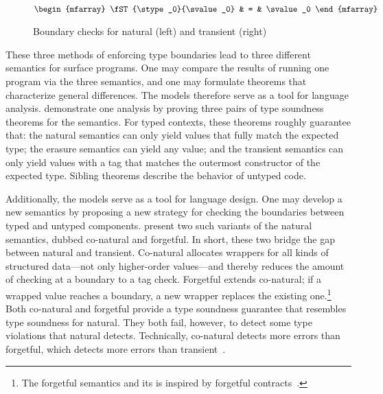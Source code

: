 \begin{figure}[ht]
\begin{minipage}[t]{0.5\columnwidth}
  \fbox{$\STsym : \tpair{\stype}{\svalue} \rightarrow \svalue \cup \serror$}\\
  \(\begin{mfarray}
    \fST{\stype_0}{\svalue_0}
    & = &
    \svalue_0
  \end{mfarray}\)
  \end{minipage}

  \caption{Boundary checks for natural (left) and transient (right)}
  \label{fig:nt-boundary}
\end{figure}

These three methods of enforcing type boundaries lead to three different
 semantics for surface programs.
One may compare the results of running one program via the three semantics,
 and one may formulate theorems that characterize general differences.
The models therefore serve as a tool for language analysis.
\citet{gf-icfp-2018} demonstrate one analysis by proving three pairs of type
 soundness theorems for the semantics.
For typed contexts, these theorems roughly guarantee that:
 the natural semantics can only yield values that fully match the expected type;
 the erasure semantics can yield any value;
 and the transient semantics can only yield values with a tag that matches
 the outermost constructor of the expected type.
Sibling theorems describe the behavior of untyped code.

Additionally, the models serve as a tool for language design.
One may develop a new semantics by proposing a new strategy for checking
 the boundaries between typed and untyped components.
\citet{gf-icfp-2018} present two such variants of the natural semantics,
 dubbed co-natural and forgetful.
In short, these two bridge the gap between natural and transient.
Co-natural allocates wrappers for all kinds of structured data---not only
 higher-order values---and thereby reduces the amount of checking at a boundary
 to a tag check.
Forgetful extends co-natural; if a wrapped value reaches a boundary, a new
 wrapper replaces the existing one.\footnote{The forgetful semantics and its
  is inspired by forgetful contracts~\cite{g-popl-2015}.}
Both co-natural and forgetful provide a type soundness guarantee that resembles
 type soundness for natural.
They both fail, however, to detect some type violations that natural detects.
Technically, co-natural detects more errors than forgetful, which detects
 more errors than transient~\cite{gf-icfp-2018}.

%

